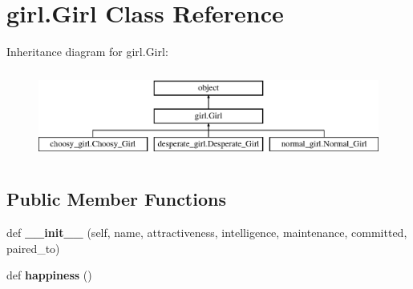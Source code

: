 \hypertarget{classgirl_1_1_girl}{}\section{girl.\+Girl Class Reference}
\label{classgirl_1_1_girl}
Inheritance diagram for girl.\+Girl\+:\begin{figure}[H]
\begin{center}
\leavevmode
\includegraphics[height=2.947368cm]{classgirl_1_1_girl}
\end{center}
\end{figure}
\subsection*{Public Member Functions}
\begin{DoxyCompactItemize}
\item 
\mbox{\label{classgirl_1_1_girl_afb15d677c65eed409ebf6bdbf4ef97f0}} 
def {\bfseries \+\_\+\+\_\+init\+\_\+\+\_\+} (self, name, attractiveness, intelligence, maintenance, committed, paired\+\_\+to)
\item 
\mbox{\label{classgirl_1_1_girl_a799e40992c24eaf1df1496a4ca112e35}} 
def {\bfseries happiness} ()
\end{DoxyCompactItemize}
